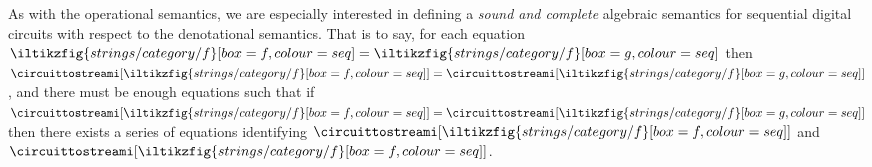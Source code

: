 As with the operational semantics, we are especially interested in defining a
\emph{sound and complete} algebraic semantics for sequential digital circuits
with respect to the denotational semantics.
That is to say, for each equation \(
    \iltikzfig{strings/category/f}[box=f,colour=seq]
    =
    \iltikzfig{strings/category/f}[box=g,colour=seq]
\) then \(
    \circuittostreami[\iltikzfig{strings/category/f}[box=f,colour=seq]]
    =
    \circuittostreami[\iltikzfig{strings/category/f}[box=g,colour=seq]]
\), and there must be enough equations such that if \(
    \circuittostreami[\iltikzfig{strings/category/f}[box=f,colour=seq]]
    =
    \circuittostreami[\iltikzfig{strings/category/f}[box=g,colour=seq]]
\) then there exists a series of equations identifying \(
    \circuittostreami[\iltikzfig{strings/category/f}[box=f,colour=seq]]
\) and \(
    \circuittostreami[\iltikzfig{strings/category/f}[box=f,colour=seq]]
\).



